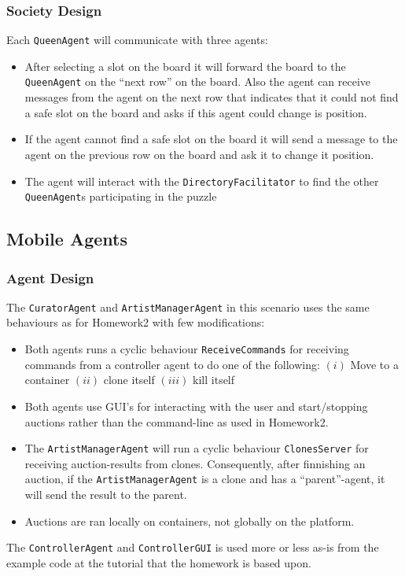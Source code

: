 \documentclass[a4paper, 11pt]{article}
\begin{document}
\subsubsection*{Society Design}
Each \texttt{QueenAgent} will communicate with three agents:
\begin{itemize}
\item After selecting a slot on the board it will forward the board to the \texttt{QueenAgent} on the ``next row'' on the board. Also the agent can receive messages from the agent on the next row that indicates that it could not find a safe slot on the board and asks if this agent could change is position.
\item If the agent cannot find a safe slot on the board it will send a message to the agent on the previous row on the board and ask it to change it position.
\item The agent will interact with the \texttt{DirectoryFacilitator} to find the other \texttt{QueenAgent}s participating in the puzzle
\end{itemize}
\subsection*{Mobile Agents}
\subsubsection*{Agent Design}
The \texttt{CuratorAgent} and \texttt{ArtistManagerAgent} in this scenario uses the same behaviours as for Homework2 with few modifications:
\begin{itemize}
\item Both agents runs a cyclic behaviour \texttt{ReceiveCommands} for receiving commands from a controller agent to do one of the following: $(i)$ Move to a container $(ii)$ clone itself $(iii)$ kill itself
\item Both agents use GUI's for interacting with the user and start/stopping auctions rather than the command-line as used in Homework2.
\item The \texttt{ArtistManagerAgent} will run a cyclic behaviour \texttt{ClonesServer} for receiving auction-results from clones. Consequently, after finnishing an auction, if the \texttt{ArtistManagerAgent} is a clone and has a ``parent''-agent, it will send the result to the parent.
\item Auctions are ran locally on containers, not globally on the platform.
\end{itemize}
The \texttt{ControllerAgent} and \texttt{ControllerGUI} is used more or less as-is from the example code at the tutorial \citep{jade_tutorial2} that the homework is based upon.
\end{document}
